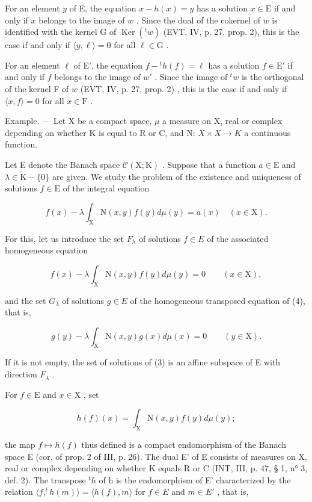 For an element \(y\) of E, the equation \(x - h(x) = y\) has a solution \(x \in \mathrm{E}\) if and only if \(x\) belongs to the image of \(w\) . Since the dual of the cokernel of \(w\) is identified with the kernel G of \(\operatorname{Ker}(^t w)\) (EVT, IV, p. 27, prop. 2), this is the case if and only if \(\langle y, \ell \rangle = 0\) for all \(\ell \in \mathrm{G}\) .

For an element \(\ell\) of E', the equation \(f - {}^t h(f) = \ell\) has a solution \(f \in \mathrm{E}'\) if and only if \(f\) belongs to the image of \(w'\) . Since the image of \({}^t w\) is the orthogonal of the kernel F of \(w\) (EVT, IV, p. 27, prop. 2) , this is the case if and only if \(\langle x, f \rangle = 0\) for all \(x \in \mathrm{F}\) .

Example. --- Let X be a compact space, \(\mu\) a measure on X, real or complex depending on whether K is equal to R or C, and N: \(X \times X \to K\) a continuous function.

Let E denote the Banach space \(\mathcal{C}(\mathrm{X};\mathrm{K})\) . Suppose that a function \(a\in\mathrm{E}\) and \(\lambda\in\mathrm{K}-\{0\}\) are given. We study the problem of the existence and uniqueness of solutions \(f\in\mathrm{E}\) of the integral equation

\[
f (x) - \lambda \int_ {\mathrm{X}} \mathrm{N} (x, y) f (y) d \mu (y) = a (x) \quad (x \in \mathrm{X}).\tag{3}
\]

For this, let us introduce the set \(F_{\lambda}\) of solutions \(f \in E\) of the associated homogeneous equation

\[
f (x) - \lambda \int_ {\mathrm{X}} \mathrm{N} (x, y) f (y) d \mu (y) = 0 \qquad (x \in \mathrm{X}),\tag{4}
\]

and the set \(G_{\lambda}\) of solutions \(g \in E\) of the homogeneous transposed equation of (4), that is,

\[
g (y) - \lambda \int_ {\mathrm{X}} \mathrm{N} (x, y) g (x) d \mu (x) = 0 \qquad (y \in \mathrm{X}).\tag{5}
\]

If it is not empty, the set of solutions of (3) is an affine subspace of E with direction \(F_{\lambda}\) .

For \(f\in \mathrm{E}\) and \(x\in \mathrm{X}\) , set

\[
h (f) (x) = \int_ {\mathrm{X}} \mathrm{N} (x, y) f (y) d \mu (y);
\]

the map \(f \mapsto h(f)\) thus defined is a compact endomorphism of the Banach space E (cor. of prop. 2 of III, p. 26). The dual E' of E consists of measures on X, real or complex depending on whether K equals R or C (INT, III, p. 47, § 1, n° 3, def. 2). The transpose \(^{t}h\) of h is the endomorphism of E' characterized by the relation \(\langle f, ^{t}h(m)\rangle = \langle h(f), m\rangle\) for \(f \in E\) and \(m \in E'\) , that is,

